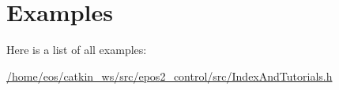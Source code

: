 \section{Examples}
Here is a list of all examples\-:\begin{DoxyCompactItemize}
\item 
\hyperlink{_2home_2eos_2catkin_ws_2src_2epos2_control_2src_2IndexAndTutorials_8h-example}{/home/eos/catkin\-\_\-ws/src/epos2\-\_\-control/src/\-Index\-And\-Tutorials.\-h}
\end{DoxyCompactItemize}
